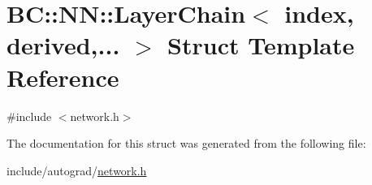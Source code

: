 \hypertarget{structBC_1_1NN_1_1LayerChain}{}\section{BC\+:\+:NN\+:\+:Layer\+Chain$<$ index, derived,... $>$ Struct Template Reference}
\label{structBC_1_1NN_1_1LayerChain}


{\ttfamily \#include $<$network.\+h$>$}



The documentation for this struct was generated from the following file\+:\begin{DoxyCompactItemize}
\item 
include/autograd/\hyperlink{network_8h}{network.\+h}\end{DoxyCompactItemize}
